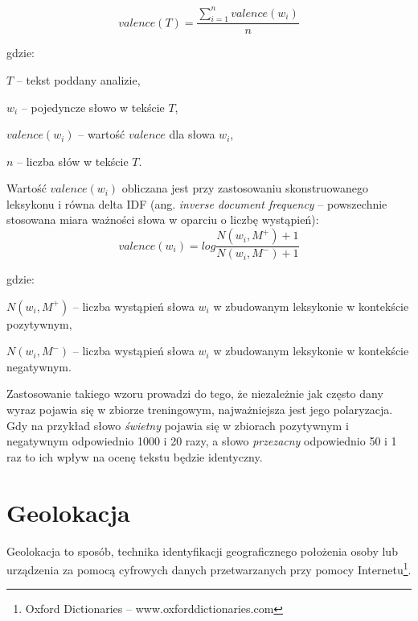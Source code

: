 \begin{equation}
valence(T) = \frac{\sum\limits_{i = 1}^n valence(w_i)}{n}
\label{equation:pakparoubek}
\end{equation}

gdzie:

$T$ -- tekst poddany analizie,

$w_i$ -- pojedyncze słowo w tekście $T$,

$valence(w_i)$ -- wartość $valence$ dla słowa $w_i$,

$n$ -- liczba słów w tekście $T$.

\bigskip


Wartość $valence(w_i)$ obliczana jest przy zastosowaniu skonstruowanego
leksykonu i równa delta IDF (ang. \textit{inverse document frequency} -- 
powszechnie stosowana miara ważności słowa w oparciu o liczbę wystąpień):
\begin{equation}
valence(w_i) = log\frac{N(w_i, M^+) + 1}{N(w_i, M^-) + 1}
\end{equation} 

gdzie:

$N(w_i, M^+)$ -- liczba wystąpień słowa $w_i$ w zbudowanym leksykonie w 
kontekście pozytywnym,

$N(w_i, M^-)$ -- liczba wystąpień słowa $w_i$ w zbudowanym leksykonie w 
kontekście negatywnym.

\bigskip
Zastosowanie takiego wzoru prowadzi do tego, że niezależnie jak często
dany wyraz pojawia się w zbiorze treningowym, najważniejsza jest jego polaryzacja.
Gdy na przykład słowo \textit{świetny} pojawia się w zbiorach pozytywnym
i negatywnym odpowiednio 1000 i 20 razy, a słowo \textit{przezacny} odpowiednio
50 i 1 raz to ich wpływ na ocenę tekstu będzie identyczny.




\section{Geolokacja}
Geolokacja to sposób, technika identyfikacji geograficznego położenia osoby
lub urządzenia za pomocą cyfrowych danych przetwarzanych przy pomocy 
Internetu\footnote{Oxford Dictionaries -- www.oxforddictionaries.com}.

